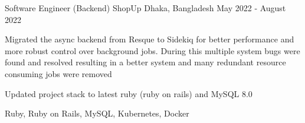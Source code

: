 \cventry
{Software Engineer (Backend)}
{ShopUp}
{Dhaka, Bangladesh}
{May 2022 ‑ August 2022}
{
    \begin{cvitems}
        \item {Migrated the async backend from Resque to Sidekiq for better performance and more robust control over background jobs. During this multiple system bugs were found and resolved resulting in a better system and many redundant resource consuming jobs were removed}
        \item{Updated project stack to latest ruby (ruby on rails) and MySQL 8.0}
    \end{cvitems}
}
{Ruby, Ruby on Rails, MySQL, Kubernetes, Docker}
    